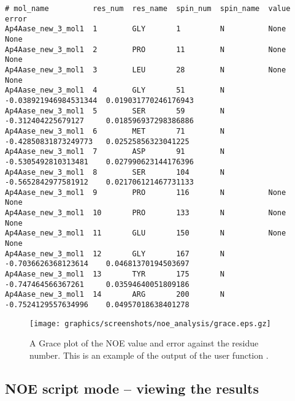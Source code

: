 {\scriptsize \begin{verbatim}
# mol_name          res_num  res_name  spin_num  spin_name  value                  error                   
Ap4Aase_new_3_mol1  1        GLY       1         N          None                   None                    
Ap4Aase_new_3_mol1  2        PRO       11        N          None                   None                    
Ap4Aase_new_3_mol1  3        LEU       28        N          None                   None                    
Ap4Aase_new_3_mol1  4        GLY       51        N          -0.038921946984531344  0.019031770246176943    
Ap4Aase_new_3_mol1  5        SER       59        N          -0.312404225679127     0.018596937298386886    
Ap4Aase_new_3_mol1  6        MET       71        N          -0.42850831873249773   0.02525856323041225     
Ap4Aase_new_3_mol1  7        ASP       91        N          -0.5305492810313481    0.027990623144176396    
Ap4Aase_new_3_mol1  8        SER       104       N          -0.5652842977581912    0.021706121467731133    
Ap4Aase_new_3_mol1  9        PRO       116       N          None                   None                    
Ap4Aase_new_3_mol1  10       PRO       133       N          None                   None                    
Ap4Aase_new_3_mol1  11       GLU       150       N          None                   None                    
Ap4Aase_new_3_mol1  12       GLY       167       N          -0.7036626368123614    0.04681370194503697     
Ap4Aase_new_3_mol1  13       TYR       175       N          -0.747464566367261     0.03594640051809186     
Ap4Aase_new_3_mol1  14       ARG       200       N          -0.7524129557634996    0.04957018638401278     
\end{verbatim}}




\begin{figure}
\centerline{\texttt{[image: graphics/screenshots/noe\_analysis/grace.eps.gz]}}
\caption[NOE plot]{A Grace plot of the NOE value and error against the residue number.  This is an example of the output of the user function .}\label{fig: NOE plot}
\end{figure}


\subsection{NOE script mode -- viewing the results}

